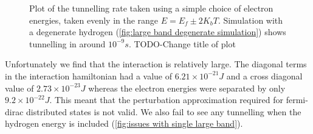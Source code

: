 \begin{figure}[htbp]
\begin{subfigure}{0.45\linewidth}
    \end{subfigure}
    \caption{Plot of the tunnelling rate taken using a
        simple choice of electron energies,
        taken evenly in the range \(E=E_f \pm 2 K_b T\).
        Simulation with a degenerate hydrogen
        (\cref{fig:large band degenerate simulation})
        shows tunnelling in around
        \(10^{-9}s\). TODO-Change title of plot}\label{fig:tunnelling rate single large band}
\end{figure}
Unfortunately we find that the interaction is
relatively large. The diagonal terms in
the interaction hamiltonian
had a value of \(6.21\times{}10^{-21}J\)
and a cross diagonal value of \(2.73\times{}10^{-23}J\)
whereas the electron energies were separated
by only \(9.2\times{}10^{-22}J\). This meant that
the perturbation approximation required for
fermi-dirac distributed states is not valid.
We also fail to see any tunnelling when
the hydrogen energy is included (\cref{fig:issues with single large band}).
